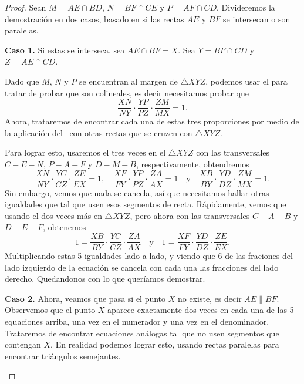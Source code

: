 \begin{proof}
    Sean $M = AE \cap BD$, $N = BF \cap CE$ y $P = AF \cap CD$.
    Divideremos la demostración en dos casos, basado en si las rectas $AE$ y $BF$ se intersecan o son paralelas.
    
    \textbf{Caso 1.}
    Si estas se interseca, sea $AE \cap BF = X$.
    Sea $Y = BF \cap CD$ y $Z = AE \cap CD$.

    \begin{multicols}{2}
    \begin{figure}[H]
        \centering
        
    \end{figure}

    Dado que $M$, $N$ y $P$ se encuentran al margen de $\triangle XYZ$, podemos usar el  para tratar de probar que son colineales, es decir necesitamos probar que
    \[
        \frac{XN}{NY} \cdot \frac{YP}{PZ} \cdot \frac{ZM}{MX} = 1.
    \]
    Ahora, trataremos de encontrar cada una de estas tres proporciones por medio de la aplicación del~ con otras rectas que se cruzen con $\triangle XYZ$.
    \end{multicols}
    Para lograr esto, usaremos el  tres veces en el $\triangle XYZ$ con las transversales $C - E - N$, $P - A - F$ y $D - M - B$, respectivamente, obtendremos
    \[
        \frac{XN}{NY} \cdot \frac{YC}{CZ} \cdot \frac{ZE}{EX} = 1, \quad \frac{XF}{FY} \cdot \frac{YP}{PZ} \cdot \frac{ZA}{AX} = 1 \quad \text{y} \quad \frac{XB}{BY} \cdot \frac{YD}{DZ} \cdot \frac{ZM}{MX} = 1.
    \]
    Sin embargo, vemos que nada se cancela, así que necesitamos hallar otras igualdades que tal que usen esos segmentos de recta.
    Rápidamente, vemos que usando el  dos veces más en $\triangle XYZ$, pero ahora con las transversales $C - A - B$ y $D - E - F$, obtenemos
    \[
        1 = \frac{XB}{BY} \cdot \frac{YC}{CZ} \cdot \frac{ZA}{AX} \quad \text{y} \quad 1 = \frac{XF}{FY} \cdot \frac{YD}{DZ} \cdot \frac{ZE}{EX}.
    \]
    Multiplicando estas 5 igualdades lado a lado, y viendo que 6 de las fraciones del lado izquierdo de la ecuación se cancela con cada una las fracciones del lado derecho.
    Quedandonos con lo que queríamos demostrar.

    \textbf{Caso 2.}
    Ahora, veamos que pasa si el punto $X$ no existe, es decir $AE \parallel BF$.
    Observemos que el punto $X$ aparece exactamente dos veces en cada una de las 5 equaciones arriba, una vez en el numerador y una vez en el denominador.
    Trataremos de encontrar ecuaciones análogas tal que no usen segmentos que contengan $X$.
    En realidad podemos lograr esto, usando rectas paralelas para encontrar triángulos semejantes.
    \begin{multicols}{2}
    \begin{figure}[H]
        \centering
        
    \end{figure}


\end{multicols}
\end{proof}
